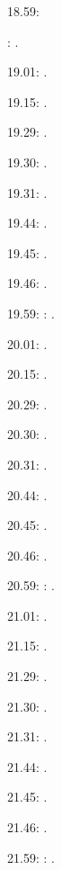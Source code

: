 \documentclass[italian]{article}
\begin{document}
18.59:     

:    .

19.01:     . 

19.15:     . 

19.29:     . 

19.30:     .

19.31:     .

19.44:     .

19.45:     .

19.46:     .

19.59:     
:    .

20.01:     . 

20.15:     . 

20.29:     . 

20.30:     .

20.31:     .

20.44:     .

20.45:     .

20.46:     .

20.59:     
:    .

21.01:     . 

21.15:     . 

21.29:     . 

21.30:     .

21.31:     .

21.44:     .

21.45:     .

21.46:     .

21.59:     
:    .
\end{document}
